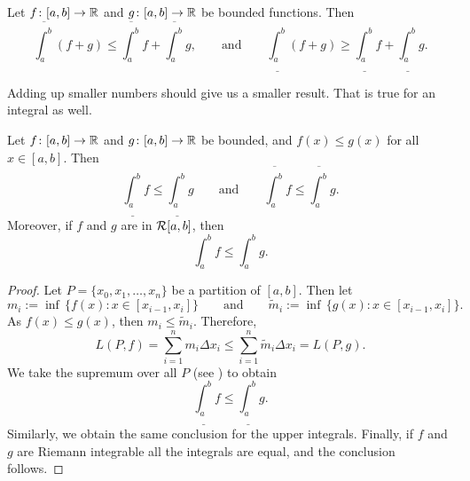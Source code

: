 \begin{prop} \label{prop:upperlowerlinineq}
Let $f \colon [a,b] \to {\mathbb{R}}$ and $g \colon [a,b] \to {\mathbb{R}}$ be bounded
functions.  Then
\begin{equation*}
\overline{\int_a^b} (f+g) \leq \overline{\int_a^b}f+\overline{\int_a^b}g
,
\qquad
\text{and}
\qquad
\underline{\int_a^b} (f+g) \geq \underline{\int_a^b}f+\underline{\int_a^b}g
.
\end{equation*}
\end{prop}

Adding up smaller numbers should give us a smaller result.
That is true for an integral as well.

\begin{prop}[Monotonicity]
Let $f \colon [a,b] \to {\mathbb{R}}$ and $g \colon [a,b] \to {\mathbb{R}}$ be
bounded, and $f(x) \leq g(x)$
for all $x \in [a,b]$.  Then
\begin{equation*}
\underline{\int_a^b} f 
\leq
\underline{\int_a^b} g 
\qquad \text{and} \qquad
\overline{\int_a^b} f 
\leq
\overline{\int_a^b} g .
\end{equation*}
Moreover, if $f$ and $g$ are in ${\mathcal{R}}[a,b]$, then
\begin{equation*}
\int_a^b f 
\leq
\int_a^b g .
\end{equation*}
\end{prop}

\begin{proof}
Let $P = \{ x_0, x_1, \ldots, x_n \}$ be a partition of $[a,b]$.  Then
let
\begin{equation*}
m_i := \inf \, \bigl\{ f(x) : x \in [x_{i-1},x_i] \bigr\}
\qquad \text{and} \qquad
\widetilde{m}_i := \inf \, \bigl\{ g(x) : x \in [x_{i-1},x_i] \bigr\} .
\end{equation*}
As $f(x) \leq g(x)$, then $m_i \leq \widetilde{m}_i$.
Therefore,
\begin{equation*}
L(P,f)
=
\sum_{i=1}^n m_i \Delta x_i
\leq
\sum_{i=1}^n \widetilde{m}_i \Delta x_i
=
L(P,g) .
\end{equation*}
We take the supremum over all $P$ (see ) to obtain 
\begin{equation*}
\underline{\int_a^b} f 
\leq
\underline{\int_a^b} g .
\end{equation*}
Similarly, we obtain the same conclusion for the upper integrals.
Finally,
if $f$ and $g$ are Riemann integrable all the integrals are equal,
and the conclusion follows.
\end{proof}


